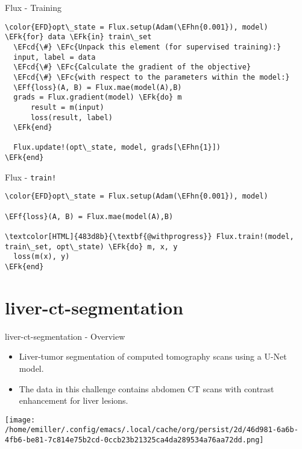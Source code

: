 \documentclass[bigger]{beamer}
\newcommand{\EFc}[1]{\textcolor{EFc}{#1}} %
\newcommand{\EFcd}[1]{\textcolor{EFcd}{#1}} %
\newcommand{\EFk}[1]{\textcolor{EFk}{#1}} %
\newcommand{\EFf}[1]{\textcolor{EFf}{#1}} %
\newcommand{\EFhn}[1]{\textcolor{EFhn}{\textbf{#1}}} %
\begin{document}
\begin{frame}[label={sec:org6bf9fe4},fragile]{Flux - Training}
 \begin{Code}
\begin{Verbatim}
\color{EFD}opt\_state = Flux.setup(Adam(\EFhn{0.001}), model)
\EFk{for} data \EFk{in} train\_set
  \EFcd{\#} \EFc{Unpack this element (for supervised training):}
  input, label = data
  \EFcd{\#} \EFc{Calculate the gradient of the objective}
  \EFcd{\#} \EFc{with respect to the parameters within the model:}
  \EFf{loss}(A, B) = Flux.mae(model(A),B)
  grads = Flux.gradient(model) \EFk{do} m
      result = m(input)
      loss(result, label)
  \EFk{end}

  Flux.update!(opt\_state, model, grads[\EFhn{1}])
\EFk{end}
\end{Verbatim}
\end{Code}
\end{frame}

\begin{frame}[label={sec:org66c51df},fragile]{Flux - \texttt{train!}}
 \begin{Code}
\begin{Verbatim}
\color{EFD}opt\_state = Flux.setup(Adam(\EFhn{0.001}), model)

\EFf{loss}(A, B) = Flux.mae(model(A),B)

\textcolor[HTML]{483d8b}{\textbf{@withprogress}} Flux.train!(model, train\_set, opt\_state) \EFk{do} m, x, y
  loss(m(x), y)
\EFk{end}
\end{Verbatim}
\end{Code}

\end{frame}

\section*{liver-ct-segmentation}
\label{sec:org4c52893}
\begin{frame}[label={sec:org32be51e}]{liver-ct-segmentation - Overview}
\begin{itemize}
\item Liver-tumor segmentation of computed tomography scans using a U-Net model.
\item The data in this challenge contains abdomen CT scans with contrast enhancement for liver lesions.
\end{itemize}

\begin{center}
\texttt{[image: /home/emiller/.config/emacs/.local/cache/org/persist/2d/46d981-6a6b-4fb6-be81-7c814e75b2cd-0ccb23b21325ca4da289534a76aa72dd.png]}
\end{center}
\end{frame}
\end{document}
